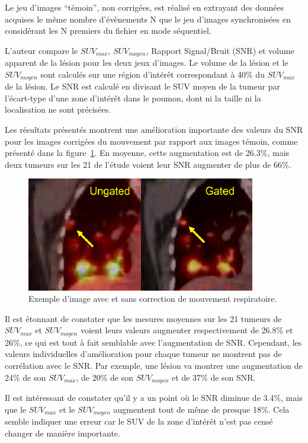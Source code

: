 Le jeu d'images ``témoin'', non corrigées, est réalisé en extrayant des données acquises le même nombre d'évènements N que le jeu d'images synchronisées en considérant les N premiers du fichier en mode séquentiel.

L'auteur compare le $SUV_{max}$, $SUV_{moyen}$, Rapport Signal/Bruit (SNR) et volume apparent de la lésion pour les deux jeux d'images. Le volume de la lésion et le $SUV _{moyen}$ sont calculés sur une région d'intérêt correspondant à 40\% du $SUV_{max}$ de la lésion. Le SNR est calculé en divisant le SUV moyen de la tumeur par l'écart-type d'une zone d'intérêt dans le poumon, dont ni la taille ni la localisation ne sont précisées. 

Les résultats présentés montrent une amélioration importante des valeurs du SNR pour les images corrigées du mouvement par rapport aux images témoin, comme présenté dans la figure~\ref{fig:guoping2010Exemple}. En moyenne, cette augmentation est de 26.3\%, mais deux tumeurs sur les 21 de l'étude voient leur SNR augmenter de plus de 66\%. 

\begin{figure}[h!]
	\centering
			\includegraphics[width=10cm]{images/guoping2010Exemple}
	\caption{Exemple d'image avec et sans correction de mouvement respiratoire.} 
	\label{fig:guoping2010Exemple}
\end{figure}




Il est étonnant de constater que les mesures moyennes sur les 21 tumeurs de $SUV_{max}$ et $SUV_{moyen}$ voient leurs valeurs augmenter respectivement de 26.8\% et 26\%, ce qui est tout à fait semblable avec l'augmentation de SNR. Cependant, les valeurs individuelles d'amélioration  pour chaque tumeur ne montrent pas de corrélation avec le SNR. Par exemple, une lésion va montrer une augmentation de 24\% de son $SUV_{max}$, de 20\% de son $SUV_{moyen}$ et de 37\% de son SNR.

Il est intéressant de constater qu'il y a un point où le SNR diminue de 3.4\%, mais que le $SUV_{max}$ et le $SUV_{moyen}$ augmentent tout de même de presque 18\%. Cela semble indiquer une erreur car le SUV de la zone d'intérêt n'est pas censé changer de manière importante.
